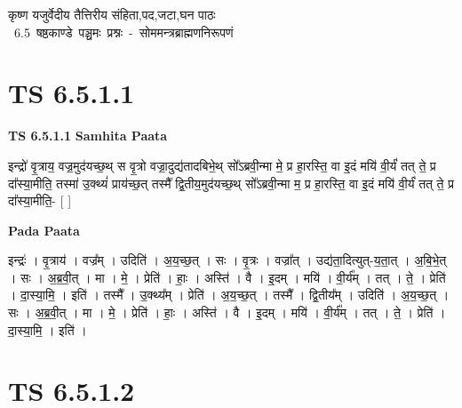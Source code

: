 \documentclass[17pt]{extarticle}
\begin{document}
\begin{titlepage}
    \begin{center}
 
\begin{sanskrit}
    { \Large
    कृष्ण यजुर्वेदीय तैत्तिरीय संहिता,पद,जटा,घन पाठः 
    }
    \\
    \vspace{2.5cm}
    \mbox{ \Large
    6.5      षष्ठकाण्डे पञ्चमः प्रश्नः - सोममन्त्रब्राह्मणनिरूपणं   }
\end{sanskrit}
\end{center}

\end{titlepage}
\tableofcontents
{}
\pagebreak


\section{ TS 6.5.1.1 }

\textbf{TS 6.5.1.1 } \newline
\textbf{Samhita Paata} \newline

इन्द्रो॑ वृ॒त्राय॒ वज्र॒मुद॑यच्छ॒थ् स वृ॒त्रो वज्रा॒दुद्य॑तादबिभे॒थ् सो᳚ऽब्रवी॒न्मा मे॒ प्र हा॒रस्ति॒ वा इ॒दं मयि॑ वी॒र्यं॑ तत् ते॒ प्र दा᳚स्या॒मीति॒ तस्मा॑ उ॒क्थ्यं॑ प्राय॑च्छ॒त् तस्मै᳚ द्वि॒तीय॒मुद॑यच्छ॒थ् सो᳚ऽब्रवी॒न्मा म॒ प्र हा॒रस्ति॒ वा इ॒दं मयि॑ वी॒र्यं॑ तत् ते॒ प्र दा᳚स्या॒मीति॒- [  ] \newline

\textbf{Pada Paata} \newline

इन्द्रः॑ । वृ॒त्राय॑ । वज्र᳚म् । उदिति॑ । अ॒य॒च्छ॒त् । सः । वृ॒त्रः । वज्रा᳚त् । उद्य॑ता॒दित्युत्-य॒ता॒त् । अ॒बि॒भे॒त् । सः । अ॒ब्र॒वी॒त् । मा । मे॒ । प्रेति॑ । हाः॒ । अस्ति॑ । वै । इ॒दम् । मयि॑ । वी॒र्य᳚म् । तत् । ते॒ । प्रेति॑ । दा॒स्या॒मि॒ । इति॑ । तस्मै᳚ । उ॒क्थ्य᳚म् । प्रेति॑ । अ॒य॒च्छ॒त् । तस्मै᳚ । द्वि॒तीय᳚म् । उदिति॑ । अ॒य॒च्छ॒त् । सः । अ॒ब्र॒वी॒त् । मा । मे॒ । प्रेति॑ । हाः॒ । अस्ति॑ । वै । इ॒दम् । मयि॑ । वी॒र्य᳚म् । तत् । ते॒ । प्रेति॑ । दा॒स्या॒मि॒ । इति॑ ।  \newline





\section{ TS 6.5.1.2 }
\end{document}

